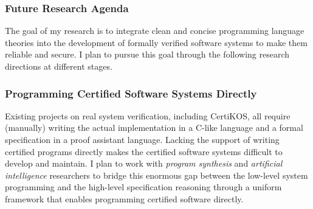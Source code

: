 \documentclass[a4paper, 10pt]{article}
\begin{document}
\begin{small}
\begin{comment}
A promising step
toward conquering this challenge is to  verify  the
end-to-end information-flow
security of the whole system formally. 
This step can be naturally established
using our CertiKOS framework~\cite{pldi16-security}. In CertiKOS, we only need to prove the noninterference between user processes 
 at the top-most layer of the system, and the contextual property of deep specifications propagates
this security guarantee down to the level of the concrete implementation.
This security guarantee
can be seen as end-to-end in the following two aspects: (1)
it applies across all the layers, and (2) it ensures that the entire
execution is secure from start to finish.
\end{comment}

\subsubsection*{\large Future Research Agenda}
The goal of my research is to
integrate clean and concise programming language theories
into the development of formally verified software systems 
to make them reliable and secure.
I plan to pursue this goal through the following research directions at different stages.


\subsubsection*{\small Programming Certified Software Systems Directly}
Existing  projects on real system verification,
including CertiKOS, all require   (manually)  writing the actual implementation
 in a C-like language and a formal specification in a proof assistant language.
Lacking the support of  writing certified  programs  directly makes the certified  software systems difficult to develop and maintain. I plan to work with \emph{program synthesis} 
and \emph{artificial intelligence} researchers to bridge this enormous gap between the low-level system programming and the high-level specification reasoning
through
a uniform framework that enables programming certified software directly.


\end{small}
\end{document}
